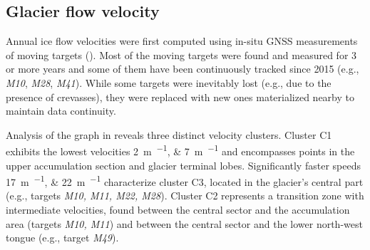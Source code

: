 \subsection{Glacier flow velocity}\label{sec:3:res:velocity}

Annual ice flow velocities were first computed using in-situ GNSS measurements of moving targets
().
Most of the moving targets were found and measured for 3 or more years and some of them have been continuously tracked since 2015 
(e.g., \textit{M10}, \textit{M28}, \textit{M41}). 
While some targets were inevitably lost (e.g., due to the presence of crevasses), they were replaced with new ones 
materialized nearby to maintain data continuity. 

Analysis of the graph in  reveals three distinct velocity clusters.  
Cluster C1 exhibits the lowest velocities \qtylist{2;7}{\meter\per\year} and encompasses points in the upper 
accumulation section and glacier terminal lobes. 
Significantly faster speeds \qtylist{17;22}{\meter\per\year} characterize cluster C3, located in the glacier's 
central part (e.g., targets \textit{M10, M11, M22, M28}). 
Cluster C2 represents a transition zone with intermediate velocities, found between the central sector 
and the accumulation area (targets \textit{M10, M11}) and between the central sector and the lower north-west tongue 
(e.g., target \textit{M49}).

